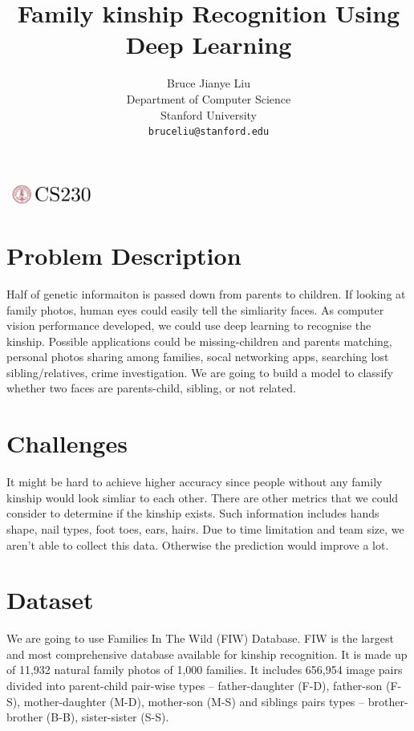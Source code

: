 \documentclass{article}
\title{Family kinship Recognition Using Deep Learning}
\author{
  Bruce Jianye Liu\\
  Department of Computer Science\\
  Stanford University\\
  \texttt{bruceliu@stanford.edu} \\
}
\begin{document}

\begin{center}
\includegraphics[width=3cm, height=0.7cm]{CS230}
\end{center}

\maketitle

\section{Problem Description}
Half of genetic informaiton is passed down from parents to children. If looking
at family photos, human eyes could easily tell the simliarity faces. As
computer vision performance developed, we could use deep learning to recognise
the kinship. Possible applications could be missing-children and parents
matching, personal photos sharing among families, socal networking apps,
searching lost sibling/relatives, crime investigation. We are going to build a
model to classify whether two faces are parents-child, sibling, or not related.

\section{Challenges}
It might be hard to achieve higher accuracy since people without any family
kinship would look simliar to each other. There are other metrics that we could
consider to determine if the kinship exists. Such information includes hands
shape, nail types, foot toes, ears, hairs. Due to time limitation and team
size, we aren't able to collect this data. Otherwise the prediction would
improve a lot.

\section{Dataset}
We are going to use Families In The Wild (FIW) Database. FIW is the largest and
most comprehensive database available for kinship recognition. It is made up of
11,932 natural family photos of 1,000 families. It includes 656,954 image pairs
divided into parent-child pair-wise types -- father-daughter (F-D), father-son
(F-S), mother-daughter (M-D), mother-son (M-S) and siblings pairs types --
brother-brother (B-B), sister-sister (S-S).
\end{document}
